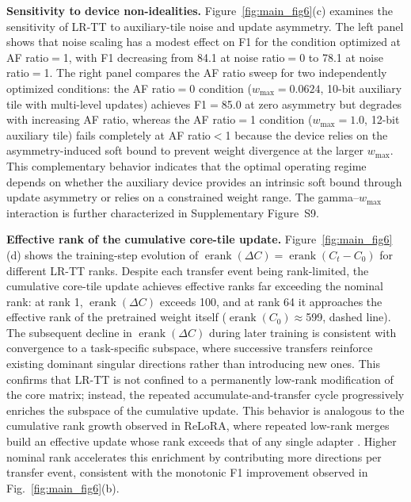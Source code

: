 \documentclass[AMA,LATO2COL]{WileyNJDv5}
\newcommand{\new}[1]{{\color{red}#1}}
\newcommand{\erank}{\operatorname{erank}}
\begin{document}
\noindent
\new{\textbf{Sensitivity to device non-idealities.}
Figure~\ref{fig:main_fig6}(c) examines the sensitivity of LR-TT to auxiliary-tile noise and update asymmetry. The left panel shows that noise scaling has a modest effect on F1 for the condition optimized at AF ratio\(=\)1, with F1 decreasing from 84.1 at noise ratio\(=\)0 to 78.1 at noise ratio\(=\)1. The right panel compares the AF ratio sweep for two independently optimized conditions: the AF ratio\(=\)0 condition (\(w_{\max}=0.0624\), 10-bit auxiliary tile with multi-level updates) achieves F1\(=\)85.0 at zero asymmetry but degrades with increasing AF ratio, whereas the AF ratio\(=\)1 condition (\(w_{\max}=1.0\), 12-bit auxiliary tile) fails completely at AF ratio\(<\)1 because the device relies on the asymmetry-induced soft bound to prevent weight divergence at the larger \(w_{\max}\). This complementary behavior indicates that the optimal operating regime depends on whether the auxiliary device provides an intrinsic soft bound through update asymmetry or relies on a constrained weight range. The gamma--\(w_{\max}\) interaction is further characterized in Supplementary Figure~S9.}

\noindent
\new{\textbf{Effective rank of the cumulative core-tile update.}
Figure~\ref{fig:main_fig6}(d) shows the training-step evolution of \(\erank(\Delta C) = \erank(C_t - C_0)\) for different LR-TT ranks. Despite each transfer event being rank-limited, the cumulative core-tile update achieves effective ranks far exceeding the nominal rank: at rank 1, \(\erank(\Delta C)\) exceeds 100, and at rank 64 it approaches the effective rank of the pretrained weight itself (\(\erank(C_0)\approx\)599, dashed line). The subsequent decline in \(\erank(\Delta C)\) during later training is consistent with convergence to a task-specific subspace, where successive transfers reinforce existing dominant singular directions rather than introducing new ones. This confirms that LR-TT is not confined to a permanently low-rank modification of the core matrix; instead, the repeated accumulate-and-transfer cycle progressively enriches the subspace of the cumulative update. This behavior is analogous to the cumulative rank growth observed in ReLoRA, where repeated low-rank merges build an effective update whose rank exceeds that of any single adapter \cite{lialin2023relora}. Higher nominal rank accelerates this enrichment by contributing more directions per transfer event, consistent with the monotonic F1 improvement observed in Fig.~\ref{fig:main_fig6}(b).}
\end{document}
